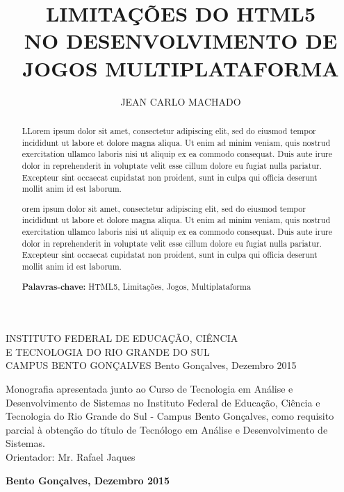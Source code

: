 \documentclass[
12pt,
a4paper,
portuges,
draft
]{report}
\title{\uppercase{Limitações do HTML5 \\ no desenvolvimento de jogos multiplataforma}}
\author{\uppercase{Jean Carlo Machado}}
\newcommand{\university}{\uppercase{Instituto Federal de Educação, Ciência \\ e Tecnologia do Rio Grande do Sul \\ Campus Bento Gonçalves}}
\newcommand{\locale}{Bento Gonçalves, Dezembro 2015}
\begin{document}


\begin{titlepage}
    \begin{center}
        {\fontsize{14}{18}\selectfont \university}
        \vfill
        {\fontsize{16}{19}\selectfont \thetitle }
        \vfill
        {\fontsize{12}{15}\selectfont \theauthor}
        \vfill
        {\locale}
    \end{center}
\end{titlepage}



\begin{titlepage}
    \begin{center}
        {\fontsize{14}{18}\selectfont \theauthor}
        \vfill
        {\fontsize{16}{19}\selectfont \thetitle }
        \vfill
        \hfill
        \parbox[s]{8cm}{
        \singlespacing
            Monografia apresentada junto ao Curso
        de Tecnologia em Análise e Desenvolvimento de Sistemas no
    Instituto Federal de Educação, Ciência e Tecnologia do Rio
Grande do Sul - Campus Bento Gonçalves, como requisito parcial à
obtenção do título de Tecnólogo em Análise e Desenvolvimento de Sistemas.
        \\
        Orientador: Mr. Rafael Jaques
        }
        \vfill
        {\bfseries \locale}
    \end{center}
\end{titlepage}

\onehalfspacing
\renewcommand{\abstractname}{\Large\bfseries RESUMO}
\begin{abstract}
{ LLorem ipsum dolor sit amet, consectetur adipiscing elit, sed do eiusmod tempor incididunt ut labore et dolore magna aliqua. Ut enim ad minim veniam, quis nostrud exercitation ullamco laboris nisi ut aliquip ex ea commodo consequat. Duis aute irure dolor in reprehenderit in voluptate velit esse cillum dolore eu fugiat nulla pariatur. Excepteur sint occaecat cupidatat non proident, sunt in culpa qui officia deserunt mollit anim id est laborum.

orem ipsum dolor sit amet, consectetur adipiscing elit, sed do eiusmod tempor incididunt ut labore et dolore magna aliqua. Ut enim ad minim veniam, quis nostrud exercitation ullamco laboris nisi ut aliquip ex ea commodo consequat. Duis aute irure dolor in reprehenderit in voluptate velit esse cillum dolore eu fugiat nulla pariatur. Excepteur sint occaecat cupidatat non proident, sunt in culpa qui officia deserunt mollit anim id est laborum.
}

{\bfseries Palavras-chave:} HTML5, Limitações, Jogos,
Multiplataforma
\end{abstract}
\end{document}
